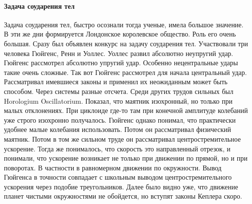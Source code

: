 \documentclass[a4paper, 12pt]{article}
\begin{document}
\paragraph{Задача соударения тел}
Задача соударения тел, быстро осознали тогда ученые, имела большое 
значение. В эти же дни формируется Лондонское королевское общество. Роль 
его очень большая. Сразу был объявлен конкурс на задачу соударения тел. 
Участвовали три человека Гюйгенс, Ренн и Уоллес. Уоллес развил абсолютно 
неупругий удар. Гюйгенс рассмотрел абсолютно упругий удар. Особенно 
нецентральные удары такие очень сложные. Так вот Гюйгенс рассмотрел для 
начала центральный удар. Рассматривал имевшиеся законы и применил их 
неожиданным может быть способом. Через системы разные отсчета. Среди 
других трудов сильных был Horologium Oscillatorium. Показал, что маятник 
изохронный, но только при малых отклонениях. При циклоиде где-то там при 
конечной амплитуде колебаний уже строго изохронно получалось. Гюйгенс 
однако понимал, что практически удобнее малые колебания использовать. 
Потом он рассматривал физический маятник. Потом в том же сильном труде 
он рассматривал центростремительное ускорение. Тогда же понималось, что 
скорость это направленный отрезок, и понимали, что ускорение возникает 
не только при движении по прямой, но и при поворотах. В частности 
в равномерном движении по окружности. Вывод Гюйгенса в точности 
совпадает с школьным выводом центростремительного ускорения через 
подобие треугольников.  Далее было видно уже, что движение планет 
чистыми окружностями не обойдется, но вступят законы Кеплера скоро.
\end{document}
